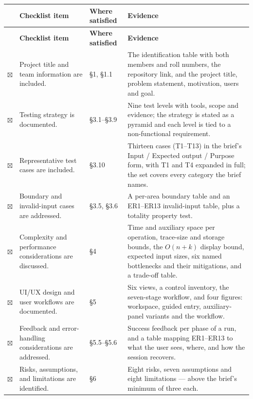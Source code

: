 \documentclass[11pt,a4paper]{article}
\newcommand{\done}{\textcolor{okc}{$\boxtimes$}}
\begin{document}
{\small
\setlength{\tabcolsep}{4pt}
\begin{longtable}{@{}C{0.7cm}L{6.4cm}L{2.3cm}L{5.6cm}@{}}
\toprule
& \textbf{Checklist item} & \textbf{Where satisfied} & \textbf{Evidence} \\
\midrule
\endfirsthead
\toprule
& \textbf{Checklist item} & \textbf{Where satisfied} & \textbf{Evidence} \\
\midrule
\endhead
\bottomrule
\endlastfoot

\done & Project title and team information are included. &
\S1, \S1.1 & The identification table with both members and roll numbers, the repository
link, and the project title, problem statement, motivation, users and goal. \\

\done & Testing strategy is documented. &
\S3.1--\S3.9 & Nine test levels with tools, scope and evidence; the strategy is stated as a
pyramid and each level is tied to a non-functional requirement. \\

\done & Representative test cases are included. &
\S3.10 & Thirteen cases (T1--T13) in the brief's Input / Expected output / Purpose form, with
T1 and T4 expanded in full; the set covers every category the brief names. \\

\done & Boundary and invalid-input cases are addressed. &
\S3.5, \S3.6 & A per-area boundary table and an ER1--ER13 invalid-input table, plus a
totality property test. \\

\done & Complexity and performance considerations are discussed. &
\S4 & Time and auxiliary space per operation, trace-size and storage bounds, the $O(n+k)$
display bound, expected input sizes, six named bottlenecks and their mitigations, and a
trade-off table. \\

\done & UI/UX design and user workflows are documented. &
\S5 & Six views, a control inventory, the seven-stage workflow, and four figures: workspace,
guided entry, auxiliary-panel variants and the workflow. \\

\done & Feedback and error-handling considerations are addressed. &
\S5.5--\S5.6 & Success feedback per phase of a run, and a table mapping ER1--ER13 to what the
user sees, where, and how the session recovers. \\

\done & Risks, assumptions, and limitations are identified. &
\S6 & Eight risks, seven assumptions and eight limitations --- above the brief's minimum of
three each. \\


\end{longtable}}
\end{document}
